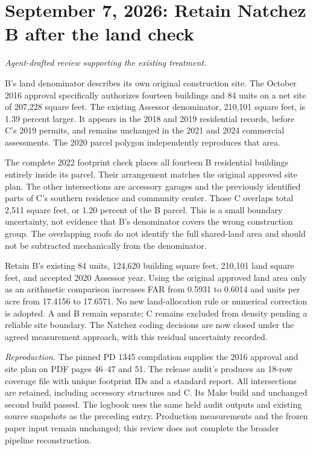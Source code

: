 \section*{September 7, 2026: Retain Natchez B after the land check}
\textit{Agent-drafted review supporting the existing treatment.}

B's land denominator describes its own original construction site. The October
2016 approval specifically authorizes fourteen buildings and 84 units on a net
site of 207,228 square feet. The existing Assessor denominator, 210,101 square
feet, is 1.39 percent larger. It appears in the 2018 and 2019 residential records,
before C's 2019 permits, and remains unchanged in the 2021 and 2024 commercial
assessments. The 2020 parcel polygon independently reproduces that area.

The complete 2022 footprint check places all fourteen B residential buildings
entirely inside its parcel. Their arrangement matches the original approved site
plan. The other intersections are accessory garages and the previously identified
parts of C's southern residence and community center. Those C overlaps total
2,511 square feet, or 1.20 percent of the B parcel. This is a small boundary
uncertainty, not evidence that B's denominator covers the wrong construction group.
The overlapping roofs do not identify the full shared-land area and should not
be subtracted mechanically from the denominator.

Retain B's existing 84 units, 124,620 building square feet, 210,101 land square
feet, and accepted 2020 Assessor year. Using the original approved land area only
as an arithmetic comparison increases FAR from 0.5931 to 0.6014 and units per
acre from 17.4156 to 17.6571. No new land-allocation rule or numerical correction
is adopted. A and B remain separate; C remains excluded from density pending a
reliable site boundary. The Natchez coding decisions are now closed under the
agreed measurement approach, with this residual uncertainty recorded.

\small
\textit{Reproduction.} The pinned PD 1345 compilation supplies the 2016 approval
and site plan on PDF pages 46--47 and 51. The release audit's
 produces an 18-row coverage file with unique
footprint IDs and a standard report. All intersections are retained, including
accessory structures and C. Its Make build and unchanged second build passed.
The logbook uses the same held audit outputs and existing source snapshots as
the preceding entry. Production measurements and the frozen paper input remain
unchanged; this review does not complete the broader pipeline reconstruction.
\normalsize
